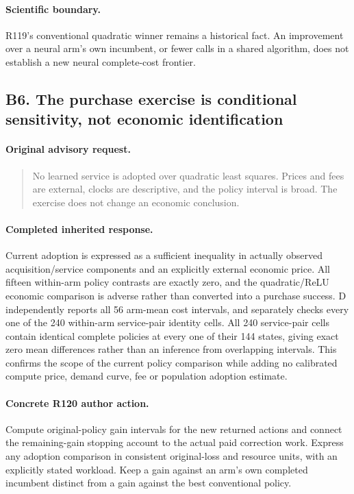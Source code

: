 \paragraph{Scientific boundary.}
R119's conventional quadratic winner remains a historical fact. An improvement over a neural arm's own incumbent, or fewer calls in a shared algorithm, does not establish a new neural complete-cost frontier.

\subsection{B6. The purchase exercise is conditional sensitivity, not economic identification}
\label{response120:B6}
\paragraph{Original advisory request.}
\begin{quote}
No learned service is adopted over quadratic least squares. Prices and fees are external, clocks are descriptive, and the policy interval is broad. The exercise does not change an economic conclusion.
\end{quote}
\paragraph{Completed inherited response.}
Current adoption is expressed as a sufficient inequality in actually observed acquisition/service components and an explicitly external economic price. All fifteen within-arm policy contrasts are exactly zero, and the quadratic/ReLU economic comparison is adverse rather than converted into a purchase success. D independently reports all 56 arm-mean cost intervals, and separately checks every one of the 240 within-arm service-pair identity cells. All 240 service-pair cells contain identical complete policies at every one of their 144 states, giving exact zero mean differences rather than an inference from overlapping intervals. This confirms the scope of the current policy comparison while adding no calibrated compute price, demand curve, fee or population adoption estimate.
\paragraph{Concrete R120 author action.}
Compute original-policy gain intervals for the new returned actions and connect the remaining-gain stopping account to the actual paid correction work. Express any adoption comparison in consistent original-loss and resource units, with an explicitly stated workload. Keep a gain against an arm's own completed incumbent distinct from a gain against the best conventional policy.

